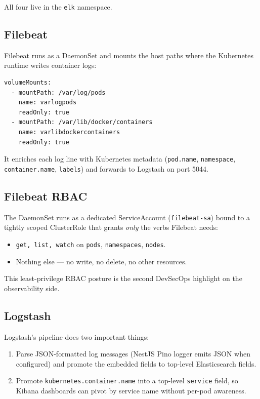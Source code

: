 \documentclass[11pt,a4paper]{article}
\begin{document}
All four live in the \texttt{elk} namespace.

\subsection{Filebeat}
Filebeat runs as a DaemonSet and mounts the host paths where the
Kubernetes runtime writes container logs:

\begin{lstlisting}
volumeMounts:
  - mountPath: /var/log/pods
    name: varlogpods
    readOnly: true
  - mountPath: /var/lib/docker/containers
    name: varlibdockercontainers
    readOnly: true
\end{lstlisting}

It enriches each log line with Kubernetes metadata
(\texttt{pod.name}, \texttt{namespace}, \texttt{container.name},
\texttt{labels}) and forwards to Logstash on port 5044.

\subsection{Filebeat RBAC}
The DaemonSet runs as a dedicated ServiceAccount
(\texttt{filebeat-sa}) bound to a tightly scoped ClusterRole that
grants \emph{only} the verbs Filebeat needs:

\begin{itemize}[leftmargin=*]
  \item \texttt{get, list, watch} on \texttt{pods},
        \texttt{namespaces}, \texttt{nodes}.
  \item Nothing else — no write, no delete, no other resources.
\end{itemize}

This least-privilege RBAC posture is the second DevSecOps highlight
on the observability side.

\subsection{Logstash}
Logstash's pipeline does two important things:

\begin{enumerate}[leftmargin=*]
  \item Parse JSON-formatted log messages (NestJS Pino logger emits
        JSON when configured) and promote the embedded fields to
        top-level Elasticsearch fields.
  \item Promote \texttt{kubernetes.container.name} into a top-level
        \texttt{service} field, so Kibana dashboards can pivot by
        service name without per-pod awareness.
\end{enumerate}
\end{document}

